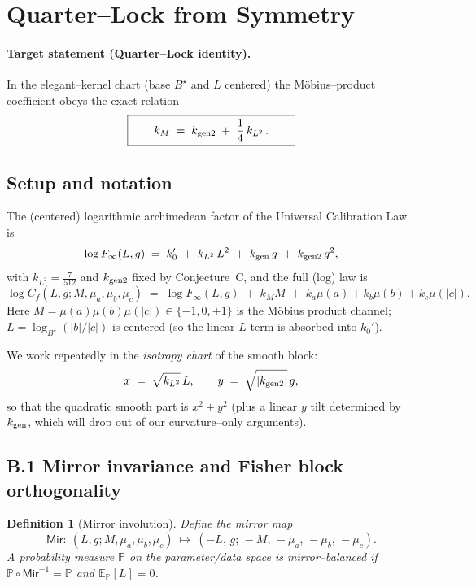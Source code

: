 \documentclass[12pt]{article}
\newtheorem{definition}[theorem]{Definition}
\numberwithin{equation}{section}
\begin{document}

\section{Quarter–Lock from Symmetry}\label{sec:conj-quarterlock}

\paragraph{Target statement (Quarter–Lock identity).}
In the elegant–kernel chart (base $B^\star$ and $L$ centered) the Möbius–product coefficient
obeys the exact relation
\[
\boxed{\qquad k_M \;=\; k_{\rm gen2} \;+\; \frac{1}{4}\,k_{L^2}\,.\qquad}
\]

\bigskip
\subsection*{Setup and notation}

The (centered) logarithmic archimedean factor of the Universal Calibration Law is
\[
\log F_\infty(L,g)\;=\;k_0' \;+\; k_{L^2}\,L^2 \;+\; k_{\rm gen}\,g \;+\; k_{\rm gen2}\,g^2,
\]
with $k_{L^2}=\tfrac{7}{512}$ and $k_{\rm gen2}$ fixed by Conjecture~C, and the full (log) law is
\[
\log C_f(L,g;M,\mu_a,\mu_b,\mu_c)\;=\;\log F_\infty(L,g)
\;+\; k_M M \;+\; k_a \mu(a)+k_b \mu(b)+k_c \mu(|c|).
\]
Here $M=\mu(a)\mu(b)\mu(|c|)\in\{-1,0,+1\}$ is the Möbius product channel; $L=\log_{B^\star}(|b|/|c|)$ is centered (so the linear $L$ term is absorbed into $k_0'$).

We work repeatedly in the \emph{isotropy chart} of the smooth block:
\[
x\;=\;\sqrt{k_{L^2}}\,L,\qquad y\;=\;\sqrt{|k_{\rm gen2}|}\,g,
\]
so that the quadratic smooth part is $x^2+y^2$ (plus a linear $y$ tilt determined by $k_{\rm gen}$, which will drop out of our curvature–only arguments).

\bigskip
\subsection*{B.1 \; Mirror invariance and Fisher block orthogonality}

\begin{definition}[Mirror involution]
Define the mirror map
\[
\mathsf{Mir}:\ (L,g;M,\mu_a,\mu_b,\mu_c)\ \longmapsto\ (-L,\,g;\,-M,\,-\mu_a,\,-\mu_b,\,-\mu_c).
\]
A probability measure $\mathbb{P}$ on the parameter/data space is \emph{mirror–balanced} if
$\mathbb{P}\circ \mathsf{Mir}^{-1}=\mathbb{P}$ and $\mathbb{E}_\mathbb{P}[L]=0$.
\end{definition}
\end{document}
